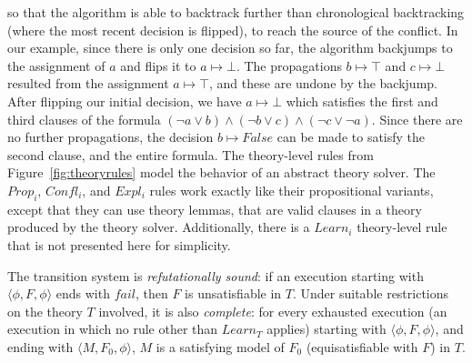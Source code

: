 \documentclass[11pt]{article}
\begin{document}
	so that the algorithm is able to 
	backtrack further than chronological
	backtracking (where the most 
	recent decision is flipped), to 
	reach the source of the conflict.
	In our example, since there is only 
	one decision so far, the algorithm
	backjumps to the assignment of 
	$a$ and flips it to $a \mapsto \bot$. The 
	propagations $b \mapsto \top$ and $c \mapsto 
	\bot$ resulted from the assignment 
	$a \mapsto \top$, and these are undone
	by the backjump. After flipping our 
	initial decision, we have $a \mapsto 
	\bot$ which satisfies
	the first and third clauses of the 
	formula $(\neg a \lor b) \land 
	(\neg b \lor c) \land (\neg c 
	\lor \neg a)$. Since there 
	are no further propagations, the 
	decision $b \mapsto False$ can be made 
	to satisfy the second clause, and the 
	entire formula. 
	The theory-level rules
	from Figure~\ref{fig:theoryrules} model 
	the behavior of an abstract 
	theory solver. The $\mathit{Prop_i}$, 
	$\mathit{Confl_i}$, and $\mathit{Expl_i}$ rules
	work exactly like their 
	propositional variants, except 
	that they can use theory lemmas, 
	that are valid clauses in a 
	theory produced by the theory
	solver. Additionally, there is a
	$Learn_i$ theory-level rule that is 
	not presented here for simplicity. 
	
	The transition system is 
	\textit{refutationally sound}:
	if an execution starting with 
	$\langle \phi, F, \phi \rangle$ ends 
	with $fail$, then $F$ is 
	unsatisfiable in $T$. Under suitable 
	restrictions on the theory $T$ 
	involved, it is also 
	\textit{complete}: for every exhausted
	execution (an execution in which no 
	rule other than $\mathit{Learn_T}$ applies)
	starting with 
	$\langle \phi, F, \phi \rangle$,
	and ending with 
	$\langle M, F_0, \phi \rangle$,
	$M$ is a satisfying model of 
	$F_0$ (equisatisfiable with $F$)
	in $T$.	
	
\end{document}
